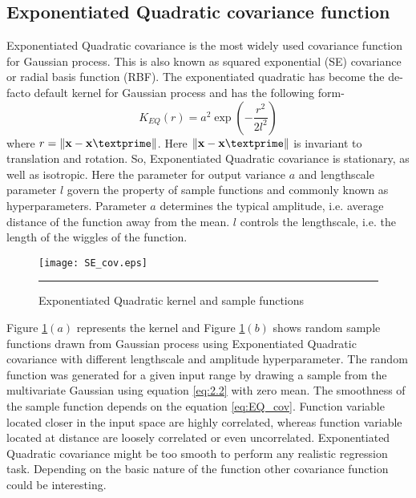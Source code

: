 \subsection{Exponentiated Quadratic covariance function}
Exponentiated Quadratic covariance is the most widely used covariance function for Gaussian process. This is also known as squared exponential (SE) covariance or radial basis function (RBF). The exponentiated quadratic has become the de-facto default kernel for Gaussian process and has the following form-
\begin{equation} \label{eq:EQ_cov}
K_{EQ}(r)= a^2 \exp \left(-\frac{r^2}{2l^2}\right)
\end{equation}
where $r=\lVert \textbf{x}-\textbf{x}\textprime \rVert$. Here $\lVert \textbf{x}-\textbf{x}\textprime \rVert$ is invariant to translation and rotation. So, Exponentiated Quadratic covariance is stationary, as well as isotropic. Here the parameter for output variance $a$ and lengthscale parameter $l$ govern the property of sample functions and commonly known as hyperparameters. Parameter $a$ determines the typical amplitude, i.e. average distance of the function away from the mean. $l$ controls the lengthscale, i.e. the length of the wiggles of the function. 
\begin{figure}[t]
	\centering
		\texttt{[image: SE\_cov.eps]}
		\rule{35em}{0.5pt}
	\caption[Exponentiated Quadratic kernel and sample functions]
		{Exponentiated Quadratic kernel and sample functions}
	\label{fig:Exponentiated_Quadratic_covariance}
\end{figure}
Figure \ref{fig:Exponentiated_Quadratic_covariance}$(a)$ represents the kernel and Figure \ref{fig:Exponentiated_Quadratic_covariance}$(b)$ shows random sample functions drawn from Gaussian process using Exponentiated Quadratic covariance with different lengthscale and amplitude hyperparameter. The random function was generated for a given input range by drawing a sample from the multivariate Gaussian using equation \ref{eq:2.2} with zero mean. The smoothness of the sample function depends on the equation \ref{eq:EQ_cov}. Function variable located closer in the input space are highly correlated, whereas function variable located at distance are loosely correlated or even uncorrelated. Exponentiated Quadratic covariance might be too smooth to perform any realistic regression task. Depending on the basic nature of the function other covariance function could be interesting.

